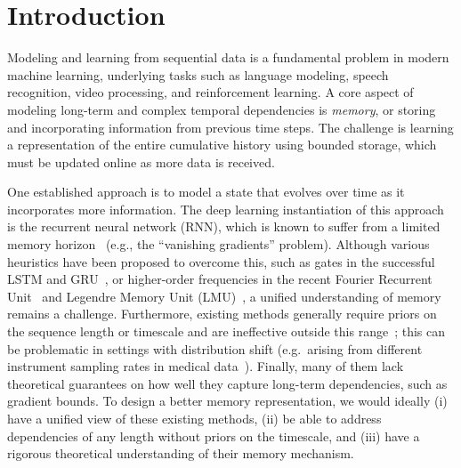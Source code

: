 

\section{Introduction}
\label{sec:intro}

  Modeling and learning from sequential data is a fundamental problem in
  modern machine learning, underlying tasks such as language modeling, speech
  recognition, video processing, and reinforcement learning.
  A core aspect of modeling long-term and complex temporal dependencies is \emph{memory}, or
  storing and incorporating information from previous time steps.
  The challenge is learning a representation of the entire cumulative history using bounded storage,
  which must be updated online as more data is received.
  

  One established approach is to model
  a state that evolves over time as it incorporates more information.
  The deep learning instantiation of this approach is the recurrent neural network (RNN),
  which is known to suffer from a limited memory horizon~\citep{lstm,jaeger2004harnessing,pascanu2013difficulty} (e.g., the ``vanishing gradients'' problem).
  Although various heuristics have been proposed to overcome this,
  such as gates in the successful LSTM and GRU~\citep{lstm, cho2014learning},
  or higher-order frequencies in the recent Fourier Recurrent
  Unit~\citep{zhang2018learning} and Legendre Memory Unit
  (LMU)~\citep{voelker2019legendre},
  a unified understanding of memory remains a challenge.
  Furthermore, existing methods generally require priors on the sequence length or timescale and are ineffective outside this range~\citep{tallec2018can, voelker2019legendre}; this can be problematic in settings with distribution shift (e.g.\ arising from different instrument sampling rates in medical data~\cite{saab2020weak,shah2018temple}).
  Finally, many of them lack theoretical guarantees on how well they capture long-term
  dependencies, such as gradient bounds.
  To design a better memory representation, we would ideally
  (i) have a unified view of these existing methods,
  (ii) be able to address dependencies of any length without priors on the timescale,
  and
  (iii) have a rigorous theoretical understanding of their memory mechanism.







